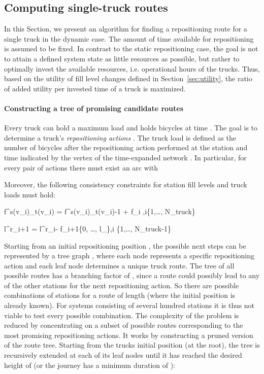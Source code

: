 \documentclass{article}
\providecommand{\Ntruck}{N_{\textrm{truck}}}
\begin{document}
\subsection{Computing single-truck routes}\label{sec:greedy}
In this Section, we present an algorithm for finding a repositioning route for a
single truck in the dynamic case. The amount of time available for repositioning
is assumed to be fixed. In contrast to the static repositioning case, the goal
is not to attain a defined system state as little resources as possible, but
rather to optimally invest the available resources, i.e. operational hours of
the trucks. Thus, based on the utility of fill level changes defined in
Section~\ref{sec:utility}, the ratio of added utility per invested time of a
truck  is maximized.

\paragraph{Constructing a tree of promising candidate routes}
Every truck  can hold a maximum load  and holds
 bicycles at time . The goal is to determine
a truck's \emph{repositioning actions} . The truck
load  is defined as the number of bicycles after the repositioning action
 performed at the station and time indicated by the vertex of the
time-expanded network . In particular, for every pair of actions
 there must exist an arc  with

Moreover, the following consistency constraints for station fill levels
and truck loads must hold:

    f^{s(v_i)}_{t(v_i)} = f^{s(v_i)}_{t(v_i)-1} + \Delta f_i \in [0, f^{s(v_i)}_{\max}],\hfill \forall i\in \{1,\ldots, \Ntruck\}
  
    l^r_{i+1} = l^r_{i}- \Delta f_{i+1}\in \{0, \ldots, l_{\max}\},\hfill \forall i \in \{1,\ldots, \Ntruck-1\}
  

Starting from an initial repositioning position , the possible next steps
can be represented by a tree graph , where each node  represents a
specific repositioning action and each leaf node determines a unique truck
route. The tree of all possible routes has a branching factor of , since a
route could possibly lead to any of the other stations for the next
repositioning action. So there are  possible combinations of
stations for a route of length  (where the initial position  is
already known). For systems consisting of several hundred stations it is thus
not viable to test every possible combination. The complexity of the problem is
reduced by concentrating on a subset of possible routes corresponding to the
most promising repositioning actions. It works by constructing a pruned version
of the route tree. Starting from the trucks initial position (at the root), the
tree is recursively extended at each of its leaf nodes until it has reached the
desired height of  (or the journey has a minimum duration of
):
\end{document}

